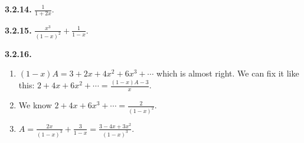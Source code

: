\documentclass[10pt,]{book}
\theoremstyle{plain}
\theoremstyle{definition}
\theoremstyle{definition}
\theoremstyle{definition}
\theoremstyle{definition}
\numberwithin{equation}{chapter}
\begin{document}
%
\par\smallskip
\noindent\textbf{3.2.14.} \hypertarget{p-1047}{}%
\(\frac{1}{1+2x}\).%
\par\smallskip
\noindent\textbf{3.2.15.} \hypertarget{p-1049}{}%
\(\frac{x^3}{(1-x)^2} + \frac{1}{1-x}\).%
\par\smallskip
\noindent\textbf{3.2.16.} \hypertarget{p-1055}{}%
\leavevmode%
\begin{enumerate}[label=(\alph*)]
\item\hypertarget{li-209}{}\((1-x)A = 3 + 2x + 4x^2 + 6x^3 + \cdots\) which is almost right.  We can fix it like this: \(2 + 4x + 6x^2 + \cdots = \frac{(1-x)A - 3}{x}\).%
\item\hypertarget{li-210}{}\hypertarget{p-1056}{}%
We know \(2 + 4x + 6x^3 + \cdots = \frac{2}{(1-x)^2}\).%
\item\hypertarget{li-211}{}\(A = \frac{2x}{(1-x)^3} + \frac{3}{1-x} = \frac{3 -4x + 3x^2}{(1-x)^3}\).%
\end{enumerate}
%
\par\smallskip
\end{document}
